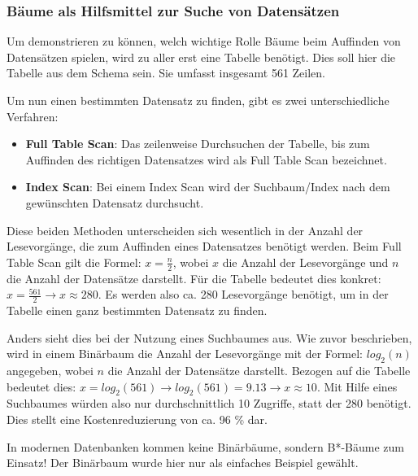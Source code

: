         \subsubsection{Bäume als Hilfsmittel zur Suche von Datensätzen}
          Um demonstrieren zu können, welch wichtige Rolle Bäume beim
          Auffinden von Datensätzen spielen, wird zu aller erst eine Tabelle
          benötigt. Dies soll hier die Tabelle  aus dem
          Schema  sein. Sie umfasst insgesamt 561 Zeilen.

          Um nun einen bestimmten Datensatz zu finden, gibt es zwei
          unterschiedliche Verfahren:
          \begin{itemize}
            \item \textbf{Full Table Scan}: Das zeilenweise Durchsuchen der
            Tabelle, bis zum Auffinden des richtigen Datensatzes wird als Full
            Table Scan bezeichnet.
            \item \textbf{Index Scan}: Bei einem Index Scan wird der
            Suchbaum/Index nach dem gewünschten Datensatz durchsucht.
          \end{itemize}
          Diese beiden Methoden unterscheiden sich wesentlich in der Anzahl der
          Lesevorgänge, die zum Auffinden eines Datensatzes benötigt werden.
          Beim Full Table Scan gilt die Formel: $x = \frac{n}{2}$, wobei $x$ die
          Anzahl der Lesevorgänge und $n$ die Anzahl der Datensätze darstellt.
          Für die Tabelle  bedeutet dies konkret: $x =
          \frac{561}{2} \rightarrow x \approx 280$. Es werden also ca. 280
          Lesevorgänge benötigt, um in der Tabelle  einen
          ganz bestimmten Datensatz zu finden.

          Anders sieht dies bei der Nutzung eines Suchbaumes aus. Wie zuvor
          beschrieben, wird in einem Binärbaum die Anzahl der Lesevorgänge
          mit der Formel: $log_2(n)$ angegeben, wobei $n$ die Anzahl der
          Datensätze darstellt. Bezogen auf die Tabelle 
          bedeutet dies: $x = log_2(561) \rightarrow log_2(561) = 9.13
          \rightarrow x \approx 10$. Mit Hilfe eines Suchbaumes würden also
          nur durchschnittlich 10 Zugriffe, statt der 280 benötigt. Dies
          stellt eine Kostenreduzierung von ca. 96 \% dar.
          \begin{merke}
            In modernen Datenbanken kommen keine Binärbäume, sondern
            B*-Bäume zum Einsatz! Der Binärbaum wurde hier nur als einfaches
            Beispiel gewählt.
          \end{merke}
